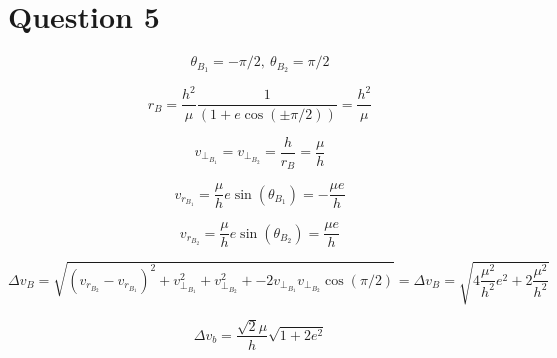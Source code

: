\section{Question 5}

$$
\theta_{B_1} = -\pi/2,~ \theta_{B_2} = \pi/2
$$

$$
r_B = \dfrac{h^2}{\mu}\dfrac{
1}{(1+e\cos(\pm \pi/2))} = \dfrac{h^2}{\mu}
$$

$$
v_{\perp_{B_1}} = v_{\perp_{B_2}} = \dfrac{h}{r_B} = \dfrac{\mu}{h}
$$

$$
v_{r_{B_1}} = \dfrac{\mu}{h}e\sin(\theta_{B_1}) =-\dfrac{\mu e}{h}
$$

$$
v_{r_{B_2}} = \dfrac{\mu}{h}e\sin(\theta_{B_2}) =\dfrac{\mu e}{h}
$$

$$
\Delta v_B = \sqrt{\left(v_{r_{B_2}} - v_{r_{B_1}}\right)^2 + 
v_{\perp_{B_1}}^2 +
v_{\perp_{B_2}}^2 +
-2v_{\perp_{B_1}}v_{\perp_{B_2}}\cos(\pi/2)
} = \Delta v_B = \sqrt{4\dfrac{\mu^2}{h^2}e^2+2\dfrac{\mu^2}{h^2}}
$$

$$
\Delta v_b = \dfrac{\sqrt{2}\mu}{h}\sqrt{1+2e^2}
$$